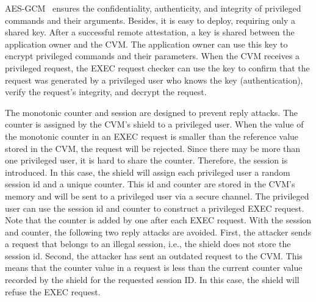 AES-GCM~\cite*{aes_gcm} ensures the confidentiality, authenticity, and integrity of privileged commands and their arguments. Besides, it is easy to deploy, requiring only a shared key. After a successful remote attestation, a key is shared between the application owner and the \acrshort{CVM}. The application owner can 
use this key to encrypt privileged commands and their parameters. When the \acrshort{CVM} receives a privileged request, the EXEC request checker can use the key to confirm that the request was generated by a privileged user who knows the key (authentication), verify the request's integrity, and decrypt the 
request.


The monotonic counter and session are designed to prevent reply attacks. The counter is assigned by the \acrshort{CVM}'s shield to a privileged user. When the value of the monotonic counter in an EXEC request is smaller than the reference value stored in the \acrshort{CVM}, the request will be rejected. Since there may be 
more than one privileged user, it is hard to share the counter. Therefore, the session is introduced. In this case, the shield will assign each privileged user a random session id and a unique counter. This id and counter are stored in the \acrshort{CVM}'s memory and will be sent to a privileged user via a secure channel. 
The privileged user can use the session id and counter to construct a privileged EXEC request. Note that the counter is added by one after each EXEC request. With the session and counter, the following two reply attacks are avoided. First, the attacker sends a request that belongs to an illegal session, 
i.e., the shield does not store the session id. Second, the attacker has sent an outdated request to the \acrshort{CVM}. This means that the counter value in a request is less than the current counter value recorded by the shield for the requested session ID. In this case, the shield will refuse the EXEC request.

